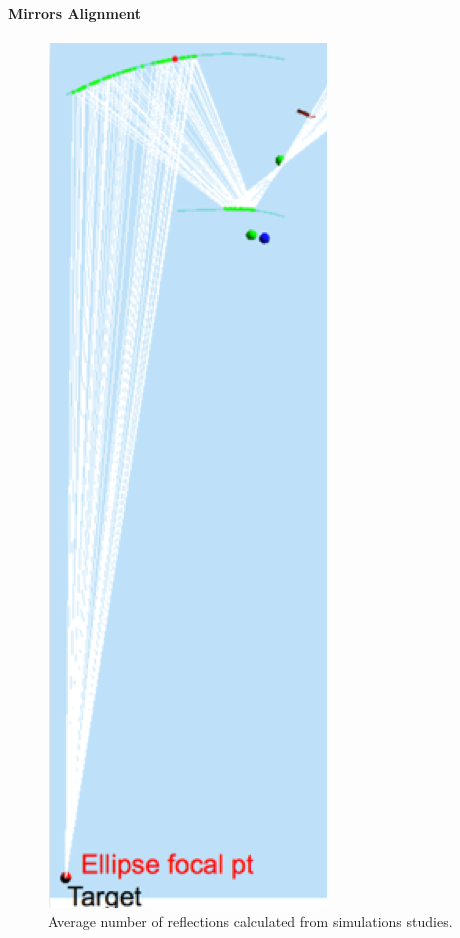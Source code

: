 \paragraph{Mirrors Alignment}



\begin{figure}[hbt]
\centering
	\includegraphics[width=1.0\columnwidth, height=0.5\textheight]{img/mirrorAlignmentSimulation.png}
	\caption{Average number of reflections calculated from simulations studies.}
	\label{fig:alignmentSimulation}
\end{figure}
